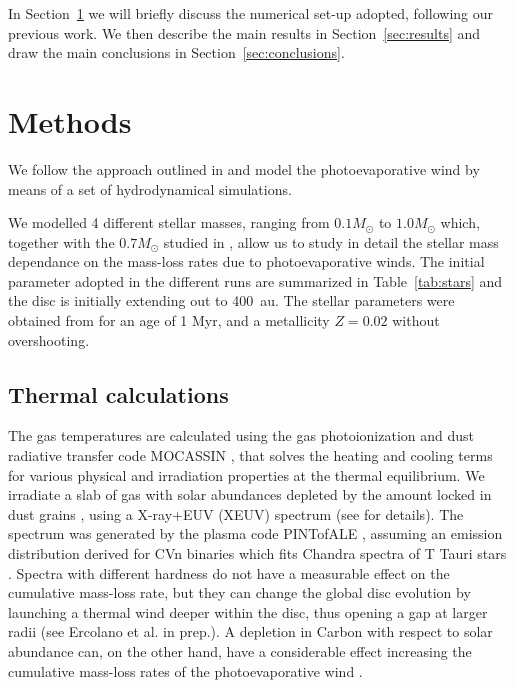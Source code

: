 \documentclass{aa}
\begin{document}
In Section~\ref{sec:methods} we will briefly discuss the numerical set-up adopted, following our previous work. We then describe the main results in Section~\ref{sec:results} and draw the main conclusions in Section~\ref{sec:conclusions}.

\section{Methods}\label{sec:methods}
We follow the approach outlined in  and model the photoevaporative wind by means of a set of hydrodynamical simulations.

We modelled 4 different stellar masses, ranging from $0.1 M_\odot$ to $1.0 M_\odot$ which, together with the $0.7 M_\odot$ studied in , allow us to study in detail the stellar mass dependance on the mass-loss rates due to photoevaporative winds.
The initial parameter adopted in the different runs are summarized in Table~\ref{tab:stars} and the disc is initially extending out to \SI{400}{au}.
The stellar parameters were obtained from  for an age of 1 Myr, and a metallicity $Z=0.02$ without overshooting.

\subsection{Thermal calculations}\label{sec:thermal-calc}
The gas temperatures are calculated using the gas photoionization and dust radiative transfer code \textsc{MOCASSIN} , that solves the heating and cooling terms for various physical and irradiation properties at the thermal equilibrium.
We irradiate a slab of gas with solar abundances  depleted by the amount locked in dust grains \citep{1996ApJ...470..893S}, using a X-ray+EUV (XEUV) spectrum (see  for details).
The spectrum was generated by the plasma code PINTofALE , assuming an emission distribution derived for CVn binaries  which fits Chandra spectra of T Tauri stars .
Spectra with different hardness do not have a measurable effect on the cumulative mass-loss rate, but they can change the global disc evolution by launching a thermal wind deeper within the disc, thus opening a gap at larger radii (see Ercolano et al. in prep.).
A depletion in Carbon with respect to solar abundance can, on the other hand, have a considerable effect increasing the cumulative mass-loss rates of the photoevaporative wind .
\end{document}
